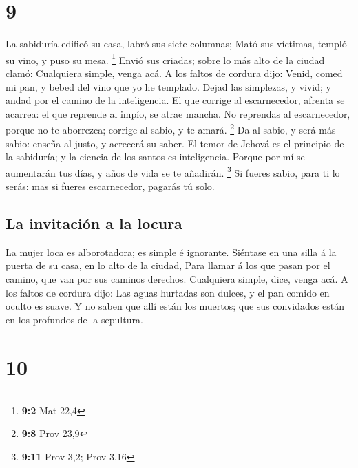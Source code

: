 \hypertarget{section-8}{%
\section{9}\label{section-8}}

 La sabiduría edificó su casa, labró sus siete columnas;
 Mató sus víctimas, templó su vino, y puso su mesa.
\footnote{\textbf{9:2} Mat 22,4}  Envió sus criadas; sobre
lo más alto de la ciudad clamó:  Cualquiera simple, venga
acá. A los faltos de cordura dijo:  Venid, comed mi pan, y
bebed del vino que yo he templado.  Dejad las simplezas, y
vivid; y andad por el camino de la inteligencia.  El que
corrige al escarnecedor, afrenta se acarrea: el que reprende al impío,
se atrae mancha.  No reprendas al escarnecedor, porque no
te aborrezca; corrige al sabio, y te amará. \footnote{\textbf{9:8} Prov
  23,9}  Da al sabio, y será más sabio: enseña al justo, y
acrecerá su saber.  El temor de Jehová es el principio de
la sabiduría; y la ciencia de los santos es inteligencia.
 Porque por mí se aumentarán tus días, y años de vida se
te añadirán. \footnote{\textbf{9:11} Prov 3,2; Prov 3,16}
 Si fueres sabio, para ti lo serás: mas si fueres
escarnecedor, pagarás tú solo.

\hypertarget{la-invitaciuxf3n-a-la-locura}{%
\subsection{La invitación a la
locura}\label{la-invitaciuxf3n-a-la-locura}}

 La mujer loca es alborotadora; es simple é ignorante.
 Siéntase en una silla á la puerta de su casa, en lo alto
de la ciudad,  Para llamar á los que pasan por el camino,
que van por sus caminos derechos.  Cualquiera simple,
dice, venga acá. A los faltos de cordura dijo:  Las aguas
hurtadas son dulces, y el pan comido en oculto es suave. 
Y no saben que allí están los muertos; que sus convidados están en los
profundos de la sepultura.

\hypertarget{section-9}{%
\section{10}\label{section-9}}

